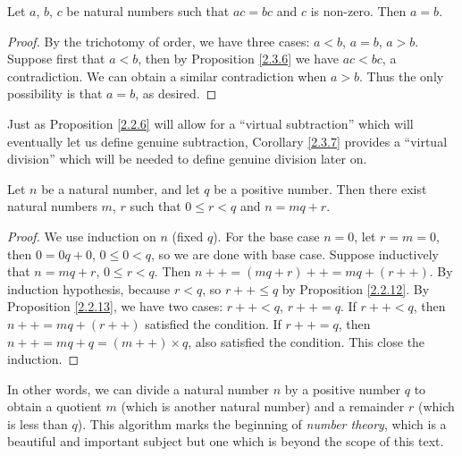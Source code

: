 \begin{corollary}\label{2.3.7}
Let \(a\), \(b\), \(c\) be natural numbers such that \(ac = bc\) and \(c\) is non-zero.
Then \(a = b\).
\end{corollary}

\begin{proof}
By the trichotomy of order, we have three cases: \(a < b\), \(a = b\), \(a > b\).
Suppose first that \(a < b\), then by Proposition \ref{2.3.6} we have \(ac < bc\), a contradiction.
We can obtain a similar contradiction when \(a > b\).
Thus the only possibility is that \(a = b\), as desired.
\end{proof}

\begin{remark}\label{2.3.8}
Just as Proposition \ref{2.2.6} will allow for a ``virtual subtraction'' which will eventually let us define genuine subtraction, Corollary \ref{2.3.7} provides a ``virtual division'' which will be needed to define genuine division later on.
\end{remark}

\begin{proposition}\label{2.3.9}
Let \(n\) be a natural number, and let \(q\) be a positive number.
Then there exist natural numbers \(m\), \(r\) such that \(0 \leq r<q\) and \(n = mq + r\).
\end{proposition}

\begin{proof}
We use induction on \(n\) (fixed \(q\)).
For the base case \(n = 0\), let \(r = m = 0\), then \(0 = 0q + 0\), \(0 \leq 0 < q\), so we are done with base case.
Suppose inductively that \(n = mq + r\), \(0 \leq r < q\).
Then \(n++ = (mq + r)++ = mq + (r++)\).
By induction hypothesis, because \(r < q\), so \(r++ \leq q\) by Proposition \ref{2.2.12}.
By Proposition \ref{2.2.13}, we have two cases: \(r++ < q\), \(r++ = q\).
If \(r++ < q\), then \(n++ = mq + (r++)\) satisfied the condition.
If \(r++ = q\), then \(n++ = mq + q = (m++) \times q\), also satisfied the condition.
This close the induction.
\end{proof}

\begin{remark}\label{2.3.10}
In other words, we can divide a natural number \(n\) by a positive number \(q\) to obtain a quotient \(m\) (which is another natural number) and a remainder \(r\) (which is less than \(q\)).
This algorithm marks the beginning of \emph{number theory}, which is a beautiful and important subject but one which is beyond the scope of this text.
\end{remark}

